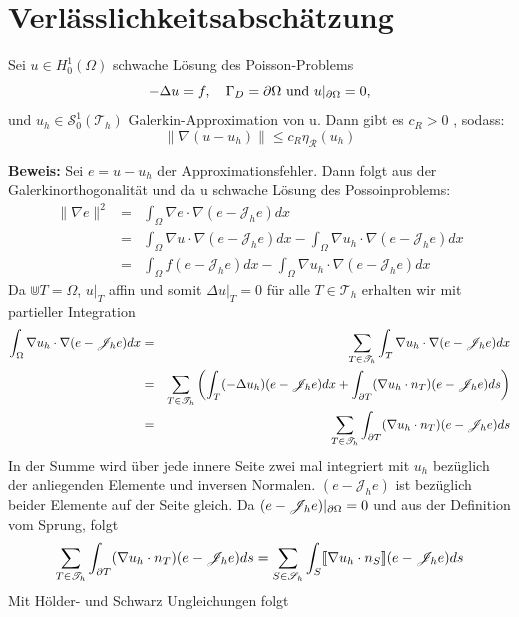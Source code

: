 \section{Verlässlichkeitsabschätzung}
\begin{theorem}[Verlässlichkeitsabschätzung]
	Sei $u\in H^1_0(\Omega)$ schwache Lösung des Poisson-Problems \[-\Delta u = f ,\quad \Gamma_D = \partial \Omega \text{ und } u|_{\partial \Omega} = 0, \] und $u_h \in \mathscr{S}^1_0(\mathscr{T}_h)$ Galerkin-Approximation von u. Dann gibt es $c_R > 0$ , sodass:
	\[\|\nabla(u-u_h)\|\leq c_R\eta_\mathscr{R}(u_h)
	\]
\end{theorem}
\textbf{Beweis:}
Sei $e = u-u_h$ der Approximationsfehler. Dann folgt aus der Galerkinorthogonalität und da u schwache Lösung des Possoinproblems:
\begin{eqnarray*}
	\|\nabla e\|^2 &=& \int_{\Omega}\nabla e \cdot \nabla (e-\mathscr{J}_he)dx \\
	&=&\int_{\Omega} \nabla u \cdot \nabla (e-\mathscr{J}_he)dx -\int_{\Omega} \nabla u_h \cdot \nabla (e-\mathscr{J}_he)dx \\
	&=&\int_{\Omega} f (e-\mathscr{J}_he)dx -\int_{\Omega} \nabla u_h \cdot \nabla (e-\mathscr{J}_he)dx
\end{eqnarray*}
Da $\Cup T = \Omega$,  $u|_T$ affin und somit $\Delta u|_T=0$ für alle $T\in\mathscr{T}_h$ erhalten wir mit partieller Integration
\begin{eqnarray*}
	\int_{\Omega}\nabla u_h\cdot\nabla (e-\mathscr{J}_he) dx &=& \sum_{T\in\mathscr{T}_h} \int_{T} \nabla u_h \cdot \nabla (e-\mathscr{J}_he) dx \\
	&=& \sum_{T\in\mathscr{T}_h} \left(\int_{T} (-\Delta u_h) (e-\mathscr{J}_he) dx +\int_{\partial T} (\nabla u_h \cdot n_T) (e-\mathscr{J}_he) ds\right) \\
	&=&\sum_{T\in\mathscr{T}_h} \int_{\partial T} (\nabla u_h \cdot n_T) (e-\mathscr{J}_he) ds
\end{eqnarray*}
In der Summe wird über jede innere Seite zwei mal integriert mit $u_h$ bezüglich der anliegenden Elemente und inversen Normalen. $(e-\mathscr{J}_he)$ ist bezüglich beider Elemente auf der Seite gleich. Da $(e-\mathscr{J}_he)|_{\partial \Omega}=0$ und aus der Definition vom Sprung, folgt
\[
\sum_{T\in\mathscr{T}_h} \int_{\partial T} (\nabla u_h \cdot n_T) (e-\mathscr{J}_he) ds =
\sum_{S\in\mathscr{S}_h} \int_{S} \llbracket \nabla u_h \cdot n_S\rrbracket (e-\mathscr{J}_he) ds
\]
Mit Hölder- und Schwarz Ungleichungen folgt
